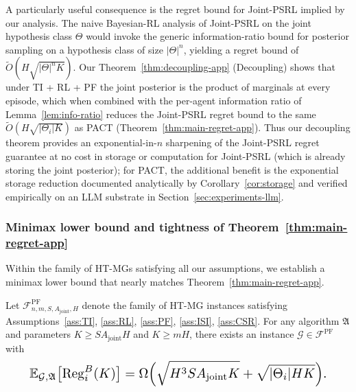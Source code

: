 \begin{remark}
A particularly useful consequence is the regret bound for Joint-PSRL implied by our analysis. The naive Bayesian-RL analysis of Joint-PSRL on the joint hypothesis class $\Theta$ would invoke the generic information-ratio bound for posterior sampling on a hypothesis class of size $|\Theta|^n$, yielding a regret bound of $\tilde O(H\sqrt{|\Theta|^n K})$. Our Theorem~\ref{thm:decoupling-app} (Decoupling) shows that under TI + RL + PF the joint posterior is the product of marginals at every episode, which when combined with the per-agent information ratio of Lemma~\ref{lem:info-ratio} reduces the Joint-PSRL regret bound to the same $\tilde O(H\sqrt{|\Theta_i| K})$ as PACT (Theorem~\ref{thm:main-regret-app}). Thus our decoupling theorem provides an exponential-in-$n$ sharpening of the Joint-PSRL regret guarantee at no cost in storage or computation for Joint-PSRL (which is already storing the joint posterior); for PACT, the additional benefit is the exponential storage reduction documented analytically by Corollary~\ref{cor:storage} and verified empirically on an LLM substrate in Section~\ref{sec:experiments-llm}.
\end{remark}

\subsubsection{Minimax lower bound and tightness of Theorem~\ref{thm:main-regret-app}}
\label{sec:lower-bound-matching}

Within the family of HT-MGs satisfying all our assumptions, we establish a minimax lower bound that nearly matches Theorem~\ref{thm:main-regret-app}.

\begin{theorem}
\label{thm:lower-matching}
Let $\mathcal{F}^{\mathrm{PF}}_{n, m, S, A_{\mathrm{joint}}, H}$ denote the family of HT-MG instances satisfying Assumptions~\ref{ass:TI}, \ref{ass:RL}, \ref{ass:PF}, \ref{ass:ISI}, \ref{ass:CSR}. For any algorithm $\mathfrak{A}$ and parameters $K \geq SA_{\mathrm{joint}}H$ and $K \geq mH$, there exists an instance $\mathcal{G} \in \mathcal{F}^{\mathrm{PF}}$ with
\begin{equation}\resizebox{0.9\linewidth}{!}{$\displaystyle \mathbb{E}_{\mathcal{G}, \mathfrak{A}}\big[\mathrm{Reg}_i^B(K)\big] = \Omega\Big(\sqrt{H^3 S A_{\mathrm{joint}} K} + \sqrt{|\Theta_i| H K}\Big). $}\end{equation}
\end{theorem}

